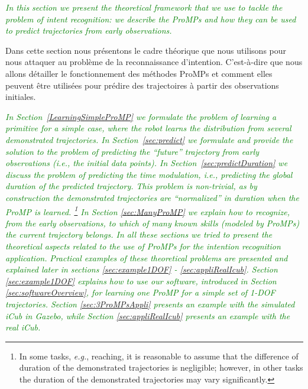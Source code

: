 \documentclass[utf8]{frontiersSCNS} %
\newcommand{\quest}[1]{\textcolor{green}{\textit{#1}}}
\begin{document}
\quest{In this section we present the theoretical framework that we use to tackle the problem of intent recognition: we describe the ProMPs and how they can be used to predict trajectories from early observations.}

Dans cette section nous présentons le cadre théorique que nous utilisons pour nous attaquer au problème de la reconnaissance d'intention. C'est-à-dire que nous allons détailler le fonctionnement des méthodes ProMPs et comment elles peuvent être utilisées pour prédire des trajectoires à partir des observations initiales.

\quest{In Section~\ref{LearningSimpleProMP} we formulate the problem of learning a primitive for a simple case, where the robot learns the distribution from several demonstrated trajectories. 
In Section~\ref{sec:predict} we formulate and provide the solution to the problem of predicting the ``future'' trajectory from early observations (\textit{i.e.}, the initial data points).
In Section~\ref{sec:predictDuration} we discuss the problem of predicting the time modulation, \textit{i.e.}, predicting the global duration of the predicted trajectory. This problem is non-trivial, as by construction the demonstrated trajectories are ``normalized'' in duration when the ProMP is learned. \footnote{In some tasks, \textit{e.g.}, reaching, it is reasonable to assume that the difference of duration of the demonstrated trajectories is negligible; however, in other tasks the duration of the demonstrated trajectories may vary significantly.}
In Section \ref{sec:ManyProMP} we explain how to recognize, from the early observations, to which of many known skills (modeled by ProMPs) the current trajectory belongs.
In all these sections we tried to present the theoretical aspects related to the use of ProMPs for the intention recognition application.
}
\quest{Practical examples of these theoretical problems are presented and explained later in sections \ref{sec:example1DOF} - \ref{sec:appliRealIcub}. 
Section \ref{sec:example1DOF} explains how to use our software, introduced in Section \ref{sec:softwareOverview}, for learning one ProMP for a simple set of 1-DOF trajectories.
Section \ref{sec:3ProMPsAppli} presents an example with the simulated iCub in Gazebo, while Section \ref{sec:appliRealIcub} presents an example with the real iCub.
}
\end{document}
